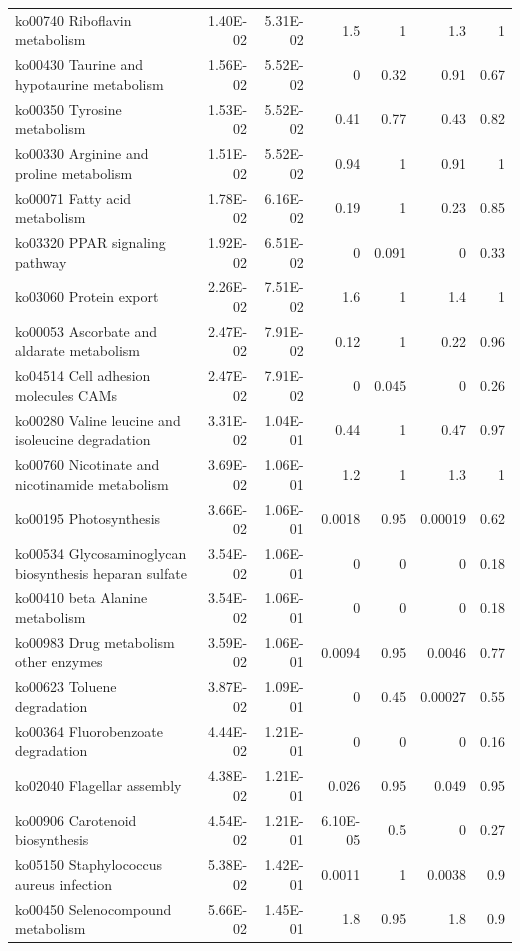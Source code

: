 {\begin{longtable}{ | l | r | r | r | r | r | r  | }
		ko00740 Riboflavin metabolism & 1.40E-02 & 5.31E-02 & 1.5 & 1 & 1.3 & 1\\ 
		ko00430 Taurine and hypotaurine metabolism & 1.56E-02 & 5.52E-02 & 0 & 0.32 & 0.91 & 0.67\\ 
		ko00350 Tyrosine metabolism & 1.53E-02 & 5.52E-02 & 0.41 & 0.77 & 0.43 & 0.82\\ 
		ko00330 Arginine and proline metabolism & 1.51E-02 & 5.52E-02 & 0.94 & 1 & 0.91 & 1\\ 
		ko00071 Fatty acid metabolism & 1.78E-02 & 6.16E-02 & 0.19 & 1 & 0.23 & 0.85\\ 
		ko03320 PPAR signaling pathway & 1.92E-02 & 6.51E-02 & 0 & 0.091 & 0 & 0.33\\ 
		ko03060 Protein export & 2.26E-02 & 7.51E-02 & 1.6 & 1 & 1.4 & 1\\ 
		ko00053 Ascorbate and aldarate metabolism & 2.47E-02 & 7.91E-02 & 0.12 & 1 & 0.22 & 0.96\\ 
		ko04514 Cell adhesion molecules CAMs  & 2.47E-02 & 7.91E-02 & 0 & 0.045 & 0 & 0.26\\ 
		ko00280 Valine leucine and isoleucine degradation & 3.31E-02 & 1.04E-01 & 0.44 & 1 & 0.47 & 0.97\\ 
		ko00760 Nicotinate and nicotinamide metabolism & 3.69E-02 & 1.06E-01 & 1.2 & 1 & 1.3 & 1\\ 
		ko00195 Photosynthesis & 3.66E-02 & 1.06E-01 & 0.0018 & 0.95 & 0.00019 & 0.62\\ 
		ko00534 Glycosaminoglycan biosynthesis heparan sulfate & 3.54E-02 & 1.06E-01 & 0 & 0 & 0 & 0.18\\ 
		ko00410 beta Alanine metabolism & 3.54E-02 & 1.06E-01 & 0 & 0 & 0 & 0.18\\ 
		ko00983 Drug metabolism other enzymes & 3.59E-02 & 1.06E-01 & 0.0094 & 0.95 & 0.0046 & 0.77\\ 
		ko00623 Toluene degradation & 3.87E-02 & 1.09E-01 & 0 & 0.45 & 0.00027 & 0.55\\ 
		ko00364 Fluorobenzoate degradation & 4.44E-02 & 1.21E-01 & 0 & 0 & 0 & 0.16\\ 
		ko02040 Flagellar assembly & 4.38E-02 & 1.21E-01 & 0.026 & 0.95 & 0.049 & 0.95\\ 
		ko00906 Carotenoid biosynthesis & 4.54E-02 & 1.21E-01 & 6.10E-05 & 0.5 & 0 & 0.27\\ 
		ko05150 Staphylococcus aureus infection & 5.38E-02 & 1.42E-01 & 0.0011 & 1 & 0.0038 & 0.9\\ 
		ko00450 Selenocompound metabolism & 5.66E-02 & 1.45E-01 & 1.8 & 0.95 & 1.8 & 0.9\\ 

\end{longtable}}
